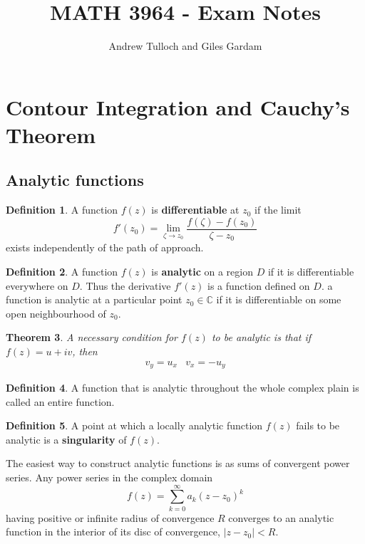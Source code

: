 \documentclass[10pt, oneside, reqno]{amsart}
\title{MATH 3964 - Exam Notes}								%
\author{Andrew Tulloch and Giles Gardam}
\theoremstyle{plain}%
\newtheorem{thm}{Theorem}[section]
\theoremstyle{definition}
\newtheorem{defn}[thm]{Definition}
\theoremstyle{remark}
\newcommand{\C}{\mathbb{C}}
\begin{document}
\maketitle



\section{Contour Integration and Cauchy's Theorem} %

\subsection{Analytic functions} %
\label{sec:analytic_functions}


\begin{defn}
	A function $f(z)$ is \textbf{differentiable} at $z_0$ if the limit \[
		f'(z_0) = \lim_{\zeta \rightarrow z_0} \frac{f(\zeta) - f(z_0)}{\zeta - z_0}
	\] exists independently of the path of approach.
\end{defn}

\begin{defn}
	A function $f(z)$ is \textbf{analytic} on a region $D$ if it is differentiable everywhere on $D$.  Thus the derivative $f'(z)$ is a function defined on $D$.  a function is analytic at a particular point $z_0 \in \C$ if it is differentiable on some open neighbourhood of $z_0$.
\end{defn}

\begin{thm}
	A necessary condition for $f(z)$ to be analytic is that if $f(z) = u + iv$, then 
	\begin{align*}
		v_y = u_x & v_x = -u_y
	\end{align*}
\end{thm}

\begin{defn}
	A function that is analytic throughout the whole complex plain is called an entire function.
\end{defn}

\begin{defn}
	A point at which a locally analytic function $f(z)$ fails to be analytic is a \textbf{singularity} of $f(z)$.
\end{defn}

The easiest way to construct analytic functions is as sums of convergent power series.  Any power series in the complex domain \[
	f(z) = \sum_{k=0}^\infty a_k (z-z_0)^k
\] having positive or infinite radius of convergence $R$ converges to an analytic function in the interior of its disc of convergence, $|z-z_0| < R$.
\end{document}
